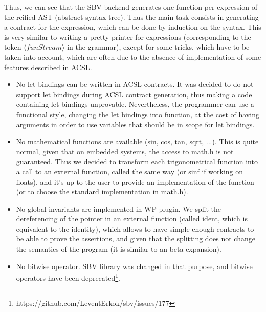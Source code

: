 \documentclass[a4paper,11pt,final]{article}
\begin{document}
  Thus, we can see that the SBV backend generates one function per expression of the reified AST (abstract syntax tree). Thus the main task consists in generating a contract for the expression, which can be done by induction on the syntax. This is very similar to writing a pretty printer for expressions (corresponding to the token $\langle funStream \rangle$ in the grammar), except for some tricks, which have to be taken into account, which are often due to the absence of implementation of some features described in ACSL.
  
  \begin{itemize}
  	\item No let bindings can be written in ACSL contracts.
  	\subitem It was decided to do not support let bindings during ACSL contract generation, thus making a code containing let bindings unprovable. Nevertheless, the programmer can use a functional style, changing the let bindings into function, at the cost of having arguments in order to use variables that should be in scope for let bindings.
  	\item No mathematical functions are available (sin, cos, tan, sqrt, ...).
  	\subitem This is quite normal, given that on embedded systems, the access to math.h is not guaranteed. Thus we decided to transform each trigonometrical function into a call to an external function, called the same way (or sinf if working on floats), and it's up to the user to provide an implementation of the function (or to choose the standard implementation in math.h).
  	\item No global invariants are implemented in WP plugin.
  	\subitem We split the dereferencing of the pointer in an external function (called ident, which is equivalent to the identity), which allows to have simple enough contracts to be able to prove the assertions, and given that the splitting does not change the semantics of the program (it is similar to an beta-expansion).
  	\item No bitwise operator.
  	\subitem SBV library was changed in that purpose, and bitwise operators have been deprecated\footnote{https://github.com/LeventErkok/sbv/issues/177}.
  \end{itemize}
  
\end{document}
